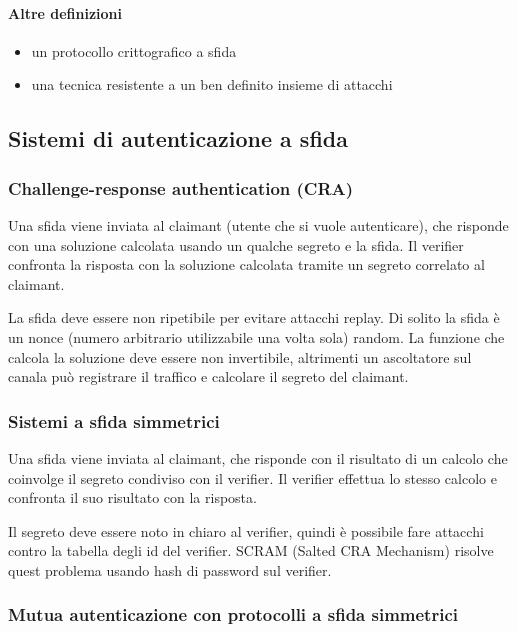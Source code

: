 \documentclass[11pt]{article}
\begin{document}
\paragraph*{Altre definizioni}
\begin{itemize}
    \item un protocollo crittografico a sfida
    \item una tecnica resistente a un ben definito insieme di attacchi 
\end{itemize}
\subsection{Sistemi di autenticazione a sfida}
\subsubsection{Challenge-response authentication (CRA)}
Una sfida viene inviata al claimant (utente che si vuole autenticare), che risponde con una soluzione calcolata usando un 
qualche segreto e la sfida. Il verifier confronta la risposta con la soluzione calcolata tramite un segreto correlato al 
claimant.

La sfida deve essere non ripetibile per evitare attacchi replay. Di solito la sfida è un nonce (numero arbitrario utilizzabile 
una volta sola) random. La funzione che calcola la soluzione deve essere non invertibile, altrimenti un ascoltatore sul canala può registrare il traffico e calcolare il 
segreto del claimant. 
\subsubsection{Sistemi a sfida simmetrici}
Una sfida viene inviata al claimant, che risponde con il risultato di un calcolo che coinvolge il segreto condiviso con 
il verifier. Il verifier effettua lo stesso calcolo e confronta il suo risultato con la risposta.

Il segreto deve essere noto in chiaro al verifier, quindi è possibile fare attacchi contro la tabella degli id del verifier.
SCRAM (Salted CRA Mechanism) risolve quest problema usando hash di password sul verifier.
\subsubsection{Mutua autenticazione con protocolli a sfida simmetrici}
\end{document}
